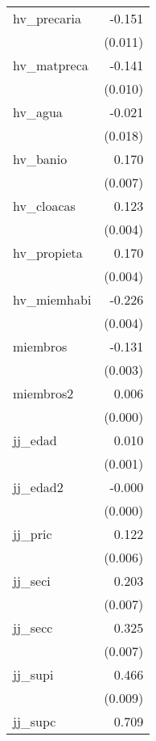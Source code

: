 {\begin{longtable}{l*{1}{D{.}{.}{-1}}}
\addlinespace
hv\_precaria &      -0.151\sym{***}\\
            &     (0.011)         \\
\addlinespace
hv\_matpreca &      -0.141\sym{***}\\
            &     (0.010)         \\
\addlinespace
hv\_agua     &      -0.021         \\
            &     (0.018)         \\
\addlinespace
hv\_banio    &       0.170\sym{***}\\
            &     (0.007)         \\
\addlinespace
hv\_cloacas  &       0.123\sym{***}\\
            &     (0.004)         \\
\addlinespace
hv\_propieta &       0.170\sym{***}\\
            &     (0.004)         \\
\addlinespace
hv\_miemhabi &      -0.226\sym{***}\\
            &     (0.004)         \\
\addlinespace
miembros    &      -0.131\sym{***}\\
            &     (0.003)         \\
\addlinespace
miembros2   &       0.006\sym{***}\\
            &     (0.000)         \\
\addlinespace
jj\_edad     &       0.010\sym{***}\\
            &     (0.001)         \\
\addlinespace
jj\_edad2    &      -0.000\sym{***}\\
            &     (0.000)         \\
\addlinespace
jj\_pric     &       0.122\sym{***}\\
            &     (0.006)         \\
\addlinespace
jj\_seci     &       0.203\sym{***}\\
            &     (0.007)         \\
\addlinespace
jj\_secc     &       0.325\sym{***}\\
            &     (0.007)         \\
\addlinespace
jj\_supi     &       0.466\sym{***}\\
            &     (0.009)         \\
\addlinespace
jj\_supc     &       0.709\sym{***}\\

\end{longtable}}
